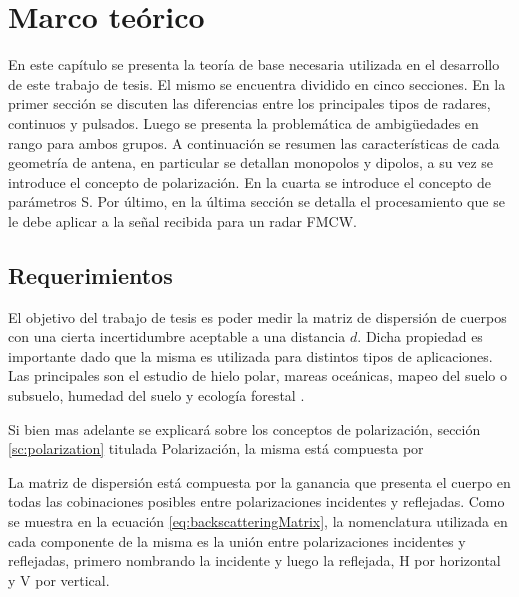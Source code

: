 
\chapter{Marco teórico} \label{ch:theory}


\ifpdf
    \graphicspath{{Chapter2/Figs/Raster/}{Chapter2/Figs/PDF/}{Chapter2/Figs/}}
\else
    \graphicspath{{Chapter2/Figs/Vector/}{Chapter2/Figs/}}
\fi

En este capítulo se presenta la teoría de base necesaria utilizada en el desarrollo de este trabajo de tesis. El mismo se encuentra dividido en cinco secciones. En la primer sección se discuten las diferencias entre los principales tipos de radares, continuos y pulsados. Luego se presenta la problemática de ambigüedades en rango para ambos grupos. A continuación se resumen las características de cada geometría de antena, en particular se detallan monopolos y dipolos, a su vez se introduce el concepto de polarización. En la cuarta se introduce el concepto de parámetros S. Por último, en la última sección se detalla el procesamiento que se le debe aplicar a la señal recibida para un radar FMCW.

\section{Requerimientos}

El objetivo del trabajo de tesis es poder medir la matriz de dispersión de cuerpos con una cierta incertidumbre aceptable a una distancia $d$. Dicha propiedad es importante dado que la misma es utilizada para distintos tipos de aplicaciones. Las principales son el estudio de hielo polar, mareas oceánicas, mapeo del suelo o subsuelo, humedad del suelo y ecología forestal \cite{Curlander}.

Si bien mas adelante se explicará sobre los conceptos de polarización, sección \ref{sc:polarization} titulada Polarización, la misma está compuesta por 

La matriz de dispersión está compuesta por la ganancia que presenta el cuerpo en todas las cobinaciones posibles entre polarizaciones incidentes y reflejadas. Como se muestra en la ecuación \ref{eq:backscatteringMatrix}, la nomenclatura utilizada en cada componente de la misma es la unión entre polarizaciones incidentes y reflejadas, primero nombrando la incidente y luego la reflejada, H por horizontal y V por vertical.

